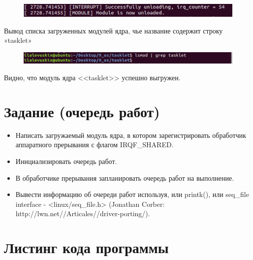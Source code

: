 \documentclass[a4paper,12pt]{article}
\begin{document}
	\begin{figure}[h!]
		\begin{center}
			{\includegraphics[scale = 0.7]{4.png}}
			\label{4}
		\end{center}
	\end{figure}
	
	Вывод списка загруженных модулей ядра, чье название содержит строку «tasklet»
	
	\begin{figure}[h!]
		\begin{center}
			{\includegraphics[scale = 0.7]{4.5.png}}
			\label{4.5}
		\end{center}
	\end{figure}
	
	Видно, что модуль ядра <<tasklet>> успешно выгружен.

	\section*{Задание (очередь работ)}
	
	\begin{itemize}
		\item Написать загружаемый модуль ядра, в котором зарегистрировать обработчик аппаратного прерывания с флагом IRQF\_SHARED.
		\item Инициализировать очередь работ.
		\item В обработчике прерывания запланировать очередь работ на выполнение.
		\item Вывести информацию об очереди работ используя, или printk(), или seq\_file interface - <linux/seq\_file.h> (Jonathan Corber: http://lwn.net//Articales//driver-porting/).
	\end{itemize}

	\newpage

	\section*{Листинг кода программы}
	
\end{document}
